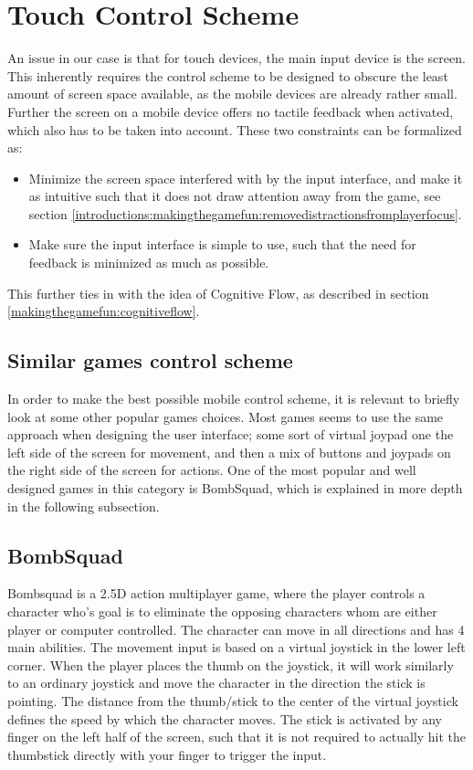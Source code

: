 \section{Touch Control Scheme}
An issue in our case is that for touch devices, the main input device is the screen.
This inherently requires the control scheme to be designed to obscure the least amount of screen space available, as the mobile devices are already rather small.
Further the screen on a mobile device offers no tactile feedback when activated, which also has to be taken into account.
These two constraints can be formalized as:
\begin{itemize}
\item Minimize the screen space interfered with by the input interface, and make it as intuitive such that it does not draw attention away from the game, see section \ref{introductions:makingthegamefun:removedistractionsfromplayerfocus}.
\item Make sure the input interface is simple to use, such that the need for feedback is minimized as much as possible.
\end{itemize}
This further ties in with the idea of Cognitive Flow, as described in section \ref{makingthegamefun:cognitiveflow}.

\subsection{Similar games control scheme}
In order to make the best possible mobile control scheme, it is relevant to briefly look at some other popular games choices.
Most games seems to use the same approach when designing the user interface; some sort of virtual joypad one the left side of the screen for movement, and then a mix of buttons and joypads on the right side of the screen for actions.
One of the most popular and well designed games in this category is BombSquad, which is explained in more depth in the following subsection.

\subsection*{BombSquad}\label{sec:modules:controlscheme:bombsquad}
Bombsquad\cite{bombsquad} is a 2.5D action multiplayer game, where the player controls a character who's goal is to eliminate the opposing characters whom are either player or computer controlled.
The character can move in all directions and has 4 main abilities.
The movement input is based on a virtual joystick in the lower left corner.
When the player places the thumb on the joystick, it will work similarly to an ordinary joystick and move the character in the direction the stick is pointing. 
The distance from the thumb/stick to the center of the virtual joystick defines the speed by which the character moves. 
The stick is activated by any finger on the left half of the screen, such that it is not required to actually hit the thumbstick directly with your finger to trigger the input.

